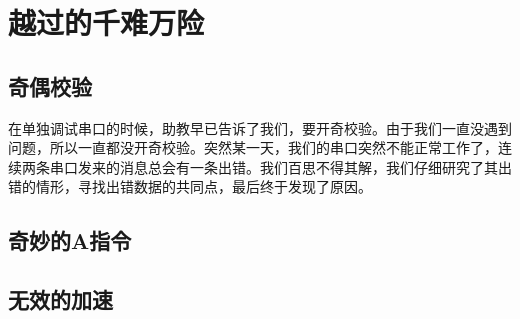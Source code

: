 \section{越过的千难万险}

\subsection{奇偶校验}

在单独调试串口的时候，助教早已告诉了我们，要开奇校验。由于我们一直没遇到问题，所以一直都没开奇校验。突然某一天，我们的串口突然不能正常工作了，连续两条串口发来的消息总会有一条出错。我们百思不得其解，我们仔细研究了其出错的情形，寻找出错数据的共同点，最后终于发现了原因。

\subsection{奇妙的A指令}

\subsection{无效的加速}

